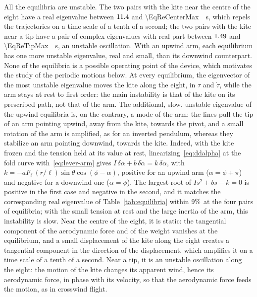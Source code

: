 All the equilibria are unstable.
The two pairs with the kite near the centre of the eight have a real eigenvalue between \(11.4\) and \SI{\EqReCenterMax}{\per\second}, which repels the trajectories on a time scale of a tenth of a second; the two pairs with the kite near a tip have a pair of complex eigenvalues with real part between \(1.49\) and \SI{\EqReTipMax}{\per\second}, an unstable oscillation.
With an upwind arm, each equilibrium has one more unstable eigenvalue, real and small, than its downwind counterpart.
None of the equilibria is a possible operating point of the device, which motivates the study of the periodic motions below.
At every equilibrium, the eigenvector of the most unstable eigenvalue moves the kite along the eight, in \(\tau\) and \(\dot\tau\), while the arm stays at rest to first order: the main instability is that of the kite on its prescribed path, not that of the arm.
The additional, slow, unstable eigenvalue of the upwind equilibria is, on the contrary, a mode of the arm: the lines pull the tip of an arm pointing upwind, away from the kite, towards the pivot, and a small rotation of the arm is amplified, as for an inverted pendulum, whereas they stabilize an arm pointing downwind, towards the kite.
Indeed, with the kite frozen and the tension held at its value at rest, linearizing~\eqref{eq:ddalpha} at the fold curve with~\eqref{eq:lever-arm} gives \(I\,\delta\ddot\alpha + b\,\delta\dot\alpha = k\,\delta\alpha\), with \(k = -a F_\ell\,(r/\ell)\sin\theta\cos(\phi-\alpha)\), positive for an upwind arm (\(\alpha = \phi+\pi\)) and negative for a downwind one (\(\alpha = \phi\)).
The largest root of \(I s^2 + b s - k = 0\) is positive in the first case and negative in the second, and it matches the corresponding real eigenvalue of Table~\ref{tab:equilibria} within \(9\%\) at the four pairs of equilibria; with the small tension at rest and the large inertia of the arm, this instability is slow.
Near the centre of the eight, it is static: the tangential component of the aerodynamic force and of the weight vanishes at the equilibrium, and a small displacement of the kite along the eight creates a tangential component in the direction of the displacement, which amplifies it on a time scale of a tenth of a second.
Near a tip, it is an unstable oscillation along the eight: the motion of the kite changes its apparent wind, hence its aerodynamic force, in phase with its velocity, so that the aerodynamic force feeds the motion, as in crosswind flight.

